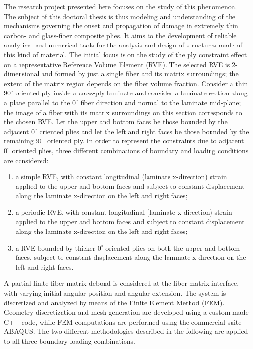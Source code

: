 \documentclass
[
a4paper,                      %
twoside,					  %
12pt,                         %
abstract,		      %
fleqn,                        %
]
{scrartcl} %
\begin{document}
The research project presented here focuses on the study of this phenomenon. The subject of this doctoral thesis is thus modeling and understanding of the mechanisms governing the onset and propagation of damage in extremely thin carbon- and glass-fiber composite plies. It aims to the development of reliable analytical and numerical tools for the analysis and design of structures made of this kind of material. The initial focus is on the study of the ply constraint effect on a representative Reference Volume Element (RVE). The selected RVE is 2-dimensional and formed by just a single fiber and its matrix surroundings; the extent of the matrix region depends on the fiber volume fraction. Consider a thin $90^{\circ}$ oriented ply inside a cross-ply laminate and consider a laminate section along a plane parallel to the $0^{\circ}$ fiber direction and normal to the laminate mid-plane; the image of a fiber with its matrix surroundings on this section corresponds to the chosen RVE. Let the upper and bottom faces be those bounded by the adjacent $0^{\circ}$ oriented plies and let the left and right faces be those bounded by the remaining $90^{\circ}$ oriented ply. In order to represent the constraints due to adjacent $0^{\circ}$ oriented plies, three different combinations of boundary and loading conditions are considered:

\begin{enumerate}
\item a simple RVE, with constant longitudinal (laminate x-direction) strain applied to the upper and bottom faces and subject to constant displacement along the laminate x-direction on the left and right faces;
\item a periodic RVE, with constant longitudinal (laminate x-direction) strain applied to the upper and bottom faces and subject to constant displacement along the laminate x-direction on the left and right faces;
\item a RVE bounded by thicker $0^{\circ}$ oriented plies on both the upper and bottom faces, subject to constant displacement along the laminate x-direction on the left and right faces.
\end{enumerate}

A partial finite fiber-matrix debond is considered at the fiber-matrix interface, with varying initial angular position and angular extension. The system is discretized and analyzed by means of the Finite Element Method (FEM). Geometry discretization and mesh generation are developed using a custom-made C++ code, while FEM computations are  performed using the commercial suite ABAQUS. The two different methodologies described in the following are applied to all three boundary-loading combinations.
\end{document}
